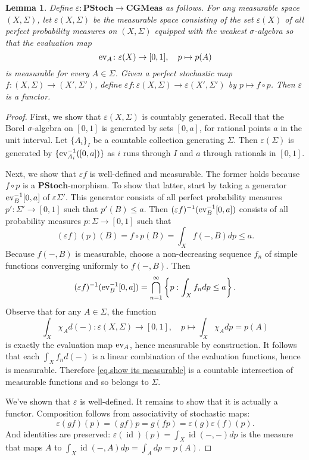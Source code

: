 \documentclass[11pt]{amsart}
\renewcommand{\epsilon}{\varepsilon}
\newcommand{\cat}[1]{\mathbf{#1}}
\newcommand{\ev}{\textup{ev}}
\newcommand{\from}{\colon}
\DeclareMathOperator{\id}{id}
\newtheorem{lem}[thm]{Lemma}
\theoremstyle{remark}
\theoremstyle{definition}
\begin{document}
\begin{lem}
	Define $\epsilon \from \cat{PStoch} \to \cat{CGMeas}$ as follows. For any measurable space $(X,\Sigma)$, let $\epsilon(X,\Sigma)$ be the measurable space consisting of the set $\epsilon (X)$ of all perfect probability measures on $(X,\Sigma)$ equipped with the weakest $\sigma$-algebra so that the evaluation map 
	\[
	\ev_A \from \epsilon (X) \to [0,1], \quad
	p \mapsto p(A)
	\]
	is measurable for every $A \in \Sigma$. Given a perfect stochastic map $f \from (X,\Sigma) \to (X',\Sigma')$, define $\epsilon f \from \epsilon(X,\Sigma) \to \epsilon(X',\Sigma')$ by $p \mapsto f \circ p$. Then $\epsilon$ is a functor.
\end{lem}
\begin{proof}
	First, we show that $\epsilon (X,\Sigma)$ is countably generated.  Recall that the Borel $\sigma$-algebra on $[0,1]$ is generated by sets $[0,a]$, for rational points $a$ in the unit interval.  Let $\{A_i\}_I$ be a countable collection generating $\Sigma$.  Then $\epsilon (\Sigma)$ is generated by $\{\ev_{A_i}^{-1}([0,a])\}$ as $i$ runs through $I$ and $a$ through rationals in $[0,1]$. 
	
	Next, we show that $\epsilon f$ is well-defined and measurable. The former holds because $f \circ p$ is a $\cat{PStoch}$-morphism. To show that latter, start by taking a generator $\ev_B^{-1}[0,a]$ of $\epsilon \Sigma'$. This generator consists of all perfect probability measures $p' \from \Sigma' \to [0,1]$ such that $p'(B) \leq a$. Then $(\epsilon f)^{-1}(\ev_B^{-1}[0,a])$ consists of all probability measures $p \from \Sigma \to [0,1]$ such that 
	\[
		(\epsilon f)(p)(B) = f \circ p (B) = \int_X f(-,B)dp \leq a. 
	\]
	Because $f(-,B)$ is measurable, choose a non-decreasing sequence $f_n$ of simple functions converging uniformly to $f(-,B)$.  Then
	\begin{equation} \label{eq.show its measurable}
		(\epsilon f)^{-1}( \ev_B^{-1}[0,a] ) 
			= \bigcap_{n =1}^{\infty} \left\{ p : \int_X f_n dp \leq a \right\}.
	\end{equation}
	 Observe that for any $A \in \Sigma$, the function 
	 \[
		 \int_X \chi_A d(-) \from \epsilon (X,\Sigma) \to [0,1], \quad
		 p \mapsto \int_X \chi_A dp = p(A)		 
	\]
	 is exactly the evaluation map $\ev_A$, hence measurable by construction. It follows that each $\int_X f_n d(-)$ is a linear combination of the evaluation functions, hence is measurable. Therefore \eqref{eq.show its measurable} is a countable intersection of measurable functions and so belongs to $\Sigma$. 
	 
	 We've shown that $\epsilon$ is well-defined.  It remains to show that it is actually a functor.  Composition follows from associativity of stochastic maps: 
	 \[
		 \epsilon (g f)(p) 
			 = (g f)p 
			 = g (f p)
			 = \epsilon (g) \epsilon (f) (p).
	 \]
	 And identities are preserved: $\epsilon (\id)(p) = \int_X \id(-,-) dp$ is the measure that maps $A$ to $\int_X \id(-,A) dp = \int_A dp = p(A)$.
\end{proof}
\end{document}

